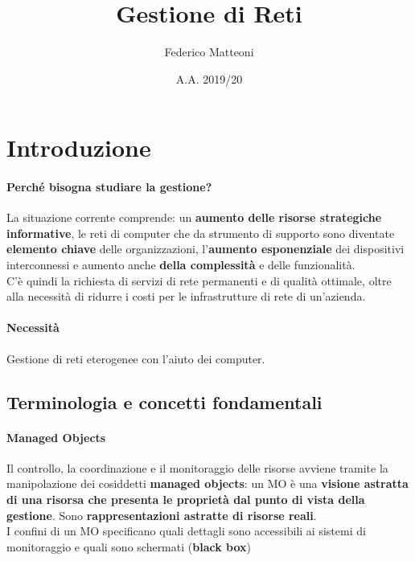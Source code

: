 \documentclass[10pt]{book}
\begin{document}
\renewcommand*\contentsname{Indice}
\title{Gestione di Reti}
\author{Federico Matteoni}
\date{A.A. 2019/20}
\maketitle
\tableofcontents
\pagebreak
\section{Introduzione}
\paragraph{Perché bisogna studiare la gestione?} La situazione corrente comprende: un \textbf{aumento delle risorse strategiche informative}, le reti di computer che da strumento di supporto sono diventate \textbf{elemento chiave} delle organizzazioni, l'\textbf{aumento esponenziale} dei dispositivi interconnessi e aumento anche \textbf{della complessità} e delle funzionalità.\\
C'è quindi la richiesta di servizi di rete permanenti e di qualità ottimale, oltre alla necessità di ridurre i costi per le infrastrutture di rete di un'azienda.
\paragraph{Necessità} Gestione di reti eterogenee con l'aiuto dei computer.
\subsection{Terminologia e concetti fondamentali}
\paragraph{Managed Objects} Il controllo, la coordinazione e il monitoraggio delle risorse avviene tramite la manipolazione dei cosiddetti \textbf{managed objects}: un MO è una \textbf{visione astratta di una risorsa che presenta le proprietà dal punto di vista della gestione}. Sono \textbf{rappresentazioni astratte di risorse reali}.\\
I confini di un MO specificano quali dettagli sono accessibili ai sistemi di monitoraggio e quali sono schermati (\textbf{black box})
\end{document}
